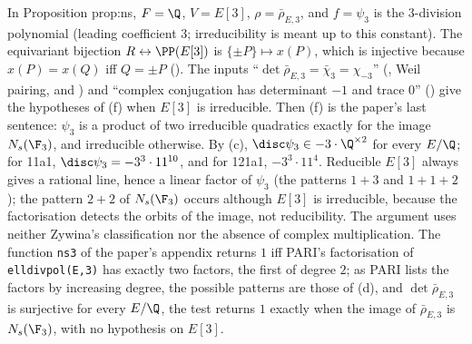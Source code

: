 \begin{paperlink}
In Proposition prop:ns, $F=\Q$, $V=E[3]$, $\rho=\bar\rho_{E,3}$, and $f=\psi_3$ is the $3$-division polynomial (leading coefficient $3$; irreducibility is meant up to
this constant). The equivariant bijection $R\leftrightarrow\PP(E[3])$ is $\{\pm P\}\mapsto x(P)$, which is injective because $x(P)=x(Q)$ iff $Q=\pm P$
(). The inputs ``$\det\bar\rho_{E,3}=\bar\chi_3=\chi_{-3}$'' (, Weil pairing, and ) and ``complex
conjugation has determinant $-1$ and trace $0$'' () give the hypotheses of (f) when $E[3]$ is irreducible. Then (f) is the
paper's last sentence: $\psi_3$ is a product of two irreducible quadratics exactly for the image $N_s(\F_3)$, and irreducible otherwise. By (c),
$\disc\psi_3\in-3\cdot\Q^{\times2}$ for every $E/\Q$; for 11a1, $\disc\psi_3=-3^3\cdot11^{10}$, and for 121a1, $-3^3\cdot11^4$. Reducible $E[3]$ always gives a
rational line, hence a linear factor of $\psi_3$ (the patterns $1+3$ and $1+1+2$); the pattern $2+2$ of $N_s(\F_3)$ occurs although $E[3]$ is irreducible, because the
factorisation detects the orbits of the image, not reducibility. The argument uses neither Zywina's classification nor the absence of complex multiplication.
The function \texttt{ns3} of the paper's appendix returns $1$ iff PARI's factorisation of \texttt{elldivpol(E,3)} has exactly two factors, the first of degree $2$;
as PARI lists the factors by increasing degree, the possible patterns are those of (d), and $\det\bar\rho_{E,3}$ is surjective for every $E/\Q$, the test
returns $1$ exactly when the image of $\bar\rho_{E,3}$ is $N_s(\F_3)$, with no hypothesis on $E[3]$.
\end{paperlink}

